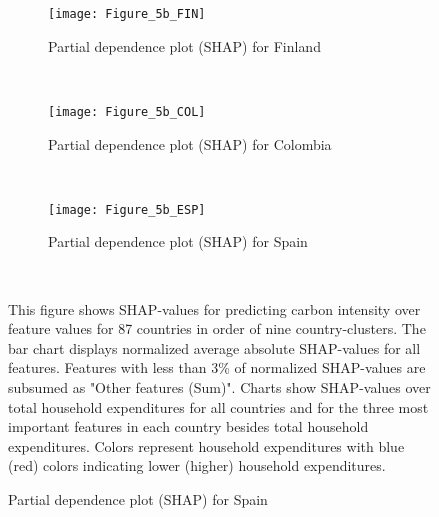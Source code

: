 \begin{figure}[ht!]\ContinuedFloat
    \centering
   \begin{subfigure}[b]{\textwidth}
         \centering
         \caption{Partial dependence plot (SHAP) for Finland}
         \label{fig:5b_FIN}
         \texttt{[image: Figure\_5b\_FIN]}         
     \end{subfigure}
    \\
    \vspace{0.5cm}
   \begin{subfigure}[b]{\textwidth}
         \centering
         \caption{Partial dependence plot (SHAP) for Colombia}
         \label{fig:5b_COL}
         \texttt{[image: Figure\_5b\_COL]}         
     \end{subfigure}
    \\
    \vspace{0.5cm}
   \begin{subfigure}[b]{\textwidth}
         \centering
         \caption{Partial dependence plot (SHAP) for Spain}
         \label{fig:5b_ESP}
         \texttt{[image: Figure\_5b\_ESP]}
    \end{subfigure}
    \\
    \vspace{0.5cm}
    \begin{subcaption2}
     This figure shows SHAP-values for predicting carbon intensity over feature values for 87 countries in order of nine country-clusters. The bar chart displays normalized average absolute SHAP-values for all features. Features with less than 3\% of normalized SHAP-values are subsumed as "Other features (Sum)". Charts show SHAP-values over total household expenditures for all countries and for the three most important features in each country besides total household expenditures. Colors represent household expenditures with blue (red) colors indicating lower (higher) household expenditures.
     \end{subcaption2}
\end{figure}

